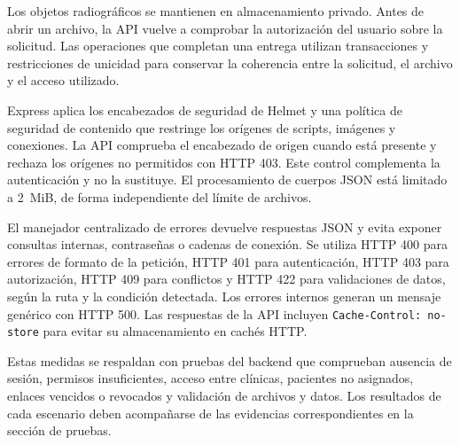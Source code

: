 Los objetos radiográficos se mantienen en almacenamiento privado. Antes
de abrir un archivo, la API vuelve a comprobar la autorización del usuario
sobre la solicitud. Las operaciones que completan una entrega utilizan
transacciones y restricciones de unicidad para conservar la coherencia
entre la solicitud, el archivo y el acceso utilizado.

Express aplica los encabezados de seguridad de Helmet y una política de
seguridad de contenido que restringe los orígenes de scripts, imágenes y
conexiones. La API comprueba el encabezado de origen cuando está presente
y rechaza los orígenes no permitidos con HTTP 403. Este control complementa
la autenticación y no la sustituye. El procesamiento de cuerpos JSON está
limitado a \mbox{2 MiB}, de forma independiente del límite de archivos.

El manejador centralizado de errores devuelve respuestas JSON y evita
exponer consultas internas, contraseñas o cadenas de conexión. Se utiliza
HTTP 400 para errores de formato de la petición, HTTP 401 para autenticación,
HTTP 403 para autorización, HTTP 409 para conflictos y HTTP 422 para
validaciones de datos, según la ruta y la condición detectada. Los errores
internos generan un mensaje genérico con HTTP 500. Las respuestas de la
API incluyen \texttt{Cache-Control: no-store} para evitar su almacenamiento
en cachés HTTP.

Estas medidas se respaldan con pruebas del backend que comprueban ausencia
de sesión, permisos insuficientes, acceso entre clínicas, pacientes no
asignados, enlaces vencidos o revocados y validación de archivos y datos.
Los resultados de cada escenario deben acompañarse de las evidencias
correspondientes en la sección de pruebas.
